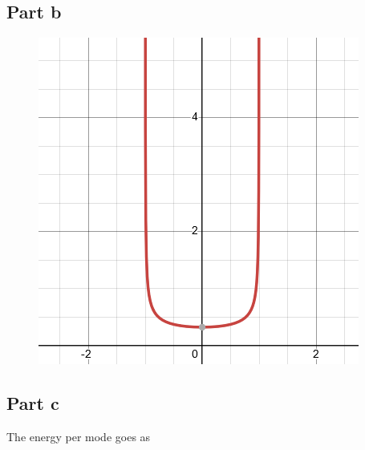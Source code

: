 \subsection*{Part b}
\begin{figure}[h]
    \centering
    \includegraphics[width=1\linewidth]{Resources//140A//Homework 4/Screenshot 2024-11-10 195146.png}
    \label{fig:enter-label}
\end{figure}


\subsection*{Part c}
The energy per mode goes as

